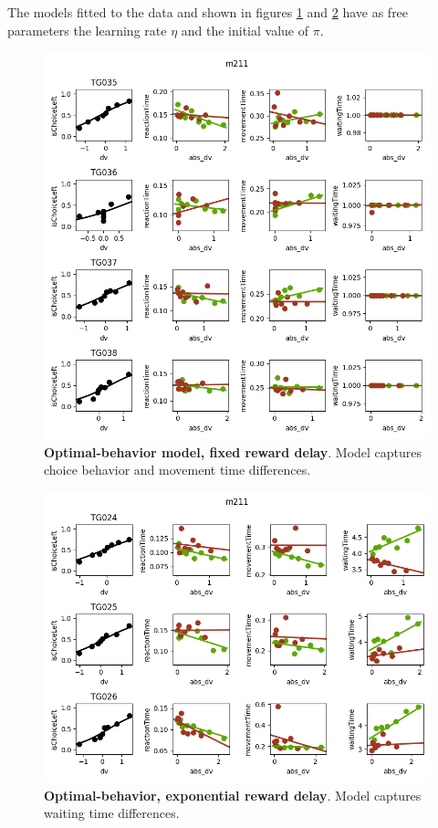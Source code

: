 The models fitted to the data and shown in figures \ref{fig:cdda2c5_m212} and \ref{fig:cdda2c5_m212_conf} have as free parameters the learning rate $\eta$ and the initial value of $\pi$.


\begin{figure}[h!]
    \centering
    \includegraphics[width=.8\linewidth]{lauglim/dv_matching_cdda2c5_m211.png}
    \caption{\textbf{Optimal-behavior model, fixed reward delay}. Model captures choice behavior and movement time differences.}
    \label{fig:cdda2c5_m212}
\end{figure}

\begin{figure}[h!]
    \centering
    \includegraphics[width=.8\linewidth]{lauglim/dv_matching_conf_m211.png}
    \caption{\textbf{Optimal-behavior, exponential reward delay}. Model captures waiting time differences.}
    \label{fig:cdda2c5_m212_conf}
\end{figure}

